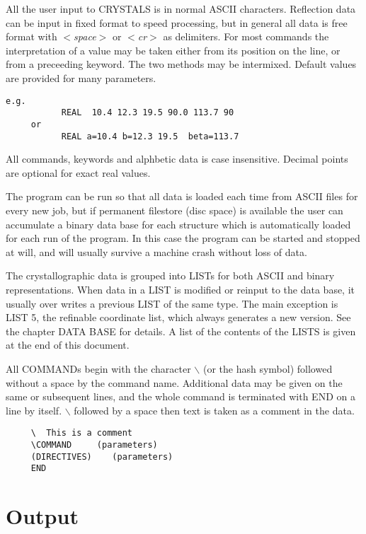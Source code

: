 \documentclass[10pt,a4paper]{report}
\begin{document}
All the user input to CRYSTALS is in normal ASCII characters. Reflection
 data can be input in fixed format to speed processing, but in general all
 data is free format with \emph{$<$space$>$} or \emph{$<$cr$>$} as delimiters. For most commands
 the interpretation of a value may be taken either from its position on the
 line, or from a preceeding keyword. The two methods may be intermixed.
 Default values are provided for many parameters.

\small\begin{verbatim}
e.g.
           REAL  10.4 12.3 19.5 90.0 113.7 90
     or
           REAL a=10.4 b=12.3 19.5  beta=113.7
\end{verbatim}\normalsize




All commands, keywords and alphbetic data is case insensitive.
 Decimal points are optional for exact real values.


The program can be run so that all data is loaded each time from ASCII files
 for every new job, but if permanent filestore (disc space)
 is available the user can
 accumulate a binary data base for each structure which is automatically
 loaded for each run of the program. In this case the program can be started
 and stopped at will, and will usually survive a machine crash without loss
 of data.


The crystallographic data is grouped into LISTs for both ASCII and
 binary representations. When data in a LIST is modified or reinput to the
 data base, it usually over writes a previous LIST of the same type. The
 main exception is LIST 5, the refinable coordinate list, which always
 generates a new version. See the chapter DATA BASE for details.
 A list of the contents of the LISTS is given at the end of this
 document.


All COMMANDs begin with the character $\backslash$ (or the hash symbol) followed without a space by
 the command name. Additional data may be given on the same or subsequent
 lines, and the whole command is terminated with END on a line by itself.
 $\backslash$ followed by a space then text is taken as a
 comment in the data.

\small\begin{verbatim}
     \  This is a comment
     \COMMAND     (parameters)
     (DIRECTIVES)    (parameters)
     END
\end{verbatim}\normalsize





\section{Output}
\end{document}
